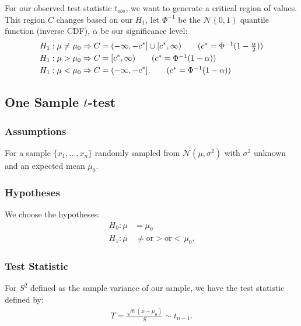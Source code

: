 \documentclass[a4paper, 12pt, twoside]{article}
\begin{document}
For our observed test statistic $t_{obs}$, we want to generate a
critical region of values. This region $C$ changes based on our
$H_1$, let $\Phi^{-1}$ be the $\mathcal{N}(0, 1)$ quantile function
(inverse CDF), $\alpha$ be our significance level:
\begin{align*}
    H_1 : \mu \neq \mu_0 & \Rightarrow
    C = (-\infty, -c^*] \cup [c^*, \infty)
    \tag{$ c^* = \Phi^{-1}(1 - \frac{\alpha}{2}) $} \\
    H_1 : \mu > \mu_0    & \Rightarrow
    C = [c^*, \infty)
    \tag{$ c^* = \Phi^{-1}(1 - \alpha) $}           \\
    H_1 : \mu < \mu_0    & \Rightarrow
    C = (-\infty, -c^*].
    \tag{$ c^* = \Phi^{-1}(1 - \alpha) $}
\end{align*}

\newpage

\subsection{One Sample $t$-test}

\subsubsection{Assumptions}

For a sample $\{x_1, \ldots, x_n\}$ randomly sampled from
$\mathcal{N}(\mu, \sigma^2)$ with $\sigma^2$ unknown and an
expected mean $\mu_0$.

\subsubsection{Hypotheses}

We choose the hypotheses:
\begin{align*}
    H_0 : \mu & = \mu_0                                   \\
    H_1 : \mu & \, \neq \text{or} > \text{or} < \, \mu_0.
\end{align*}

\subsubsection{Test Statistic}

For $S^2$ defined as the sample variance of our sample, we have
the test statistic defined by:
\begin{align*}
    T = \frac{\sqrt{n}(\overline{x} - \mu_0)}{S} \sim t_{n-1}.
\end{align*}
\end{document}
